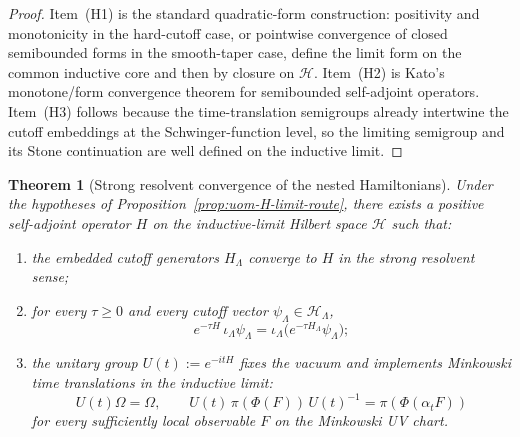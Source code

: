 \documentclass[10pt]{article}
\theoremstyle{definition}
\theoremstyle{plain}
\newtheorem{theorem}{Theorem}[section]
\begin{document}
\begin{proof}
Item~\textnormal{(H1)} is the standard quadratic-form construction: positivity and monotonicity in the hard-cutoff case, or pointwise convergence of closed semibounded forms in the smooth-taper case, define the limit form on the common inductive core and then by closure on $\mathcal H$.  Item~\textnormal{(H2)} is Kato's monotone/form convergence theorem for semibounded self-adjoint operators.  Item~\textnormal{(H3)} follows because the time-translation semigroups already intertwine the cutoff embeddings at the Schwinger-function level, so the limiting semigroup and its Stone continuation are well defined on the inductive limit.
\end{proof}

\begin{theorem}[Strong resolvent convergence of the nested Hamiltonians]
\label{thm:uom-H-limit}
Under the hypotheses of Proposition~\ref{prop:uom-H-limit-route}, there exists a positive self-adjoint operator $H$ on the inductive-limit Hilbert space $\mathcal H$ such that:
\begin{enumerate}[label=\textnormal{(\roman*)},leftmargin=2.2em,itemsep=1pt]
\item the embedded cutoff generators $H_\Lambda$ converge to $H$ in the strong resolvent sense;
\item for every $\tau\ge 0$ and every cutoff vector $\psi_\Lambda\in\mathcal H_\Lambda$,
\[
e^{-\tau H}\,\iota_\Lambda\psi_\Lambda
=
\iota_\Lambda\big(e^{-\tau H_\Lambda}\psi_\Lambda\big);
\]
\item the unitary group $U(t):=e^{-itH}$ fixes the vacuum and implements Minkowski time translations in the inductive limit:
\[
U(t)\Omega=\Omega,
\qquad
U(t)\,\pi(\Phi(F))\,U(t)^{-1}=\pi(\Phi(\alpha_tF))
\]
for every sufficiently local observable $F$ on the Minkowski UV chart.
\end{enumerate}
\end{theorem}
\end{document}
